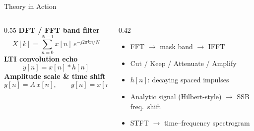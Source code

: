 \begin{frame}{Theory in Action}
  \small
  \begin{columns}[T, totalwidth=\textwidth]
    \begin{column}{0.55\textwidth}
      \textbf{DFT / FFT band filter}
      \[
        X[k] = \sum_{n=0}^{N-1} x[n]\, e^{-j2\pi kn/N}
      \]
      \vspace{-0.15cm}
      \textbf{LTI convolution echo}
      \[
        y[n] = x[n] * h[n]
      \]
      \vspace{-0.15cm}
      \textbf{Amplitude scale \& time shift}
      \[
        y[n] = A\,x[n], \qquad y[n] = x[n - n_0]
      \]
    \end{column}
    \begin{column}{0.42\textwidth}
      \begin{itemize}
        \item FFT $\rightarrow$ mask band $\rightarrow$ IFFT
        \item Cut / Keep / Attenuate / Amplify
        \item $h[n]$: decaying spaced impulses
        \item Analytic signal (Hilbert-style) $\rightarrow$ SSB freq.\ shift
        \item STFT $\rightarrow$ time--frequency spectrogram
      \end{itemize}
    \end{column}
  \end{columns}
  \vspace{0.25cm}
\end{frame}
